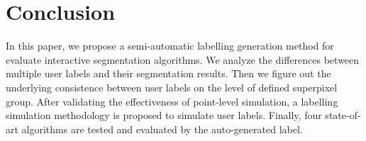 \documentclass[runningheads,a4paper]{llncs}
\begin{document}
\section{Conclusion}
In this paper, we propose a semi-automatic labelling generation method for evaluate interactive segmentation algorithms. We analyze the differences between multiple user labels and their segmentation results. Then we figure out the underlying consistence between user labels on the level of defined superpixel group. After validating the effectiveness of point-level simulation, a labelling simulation methodology is proposed to simulate user labels. Finally, four state-of-art algorithms are tested and evaluated by the auto-generated label.




\end{document}
